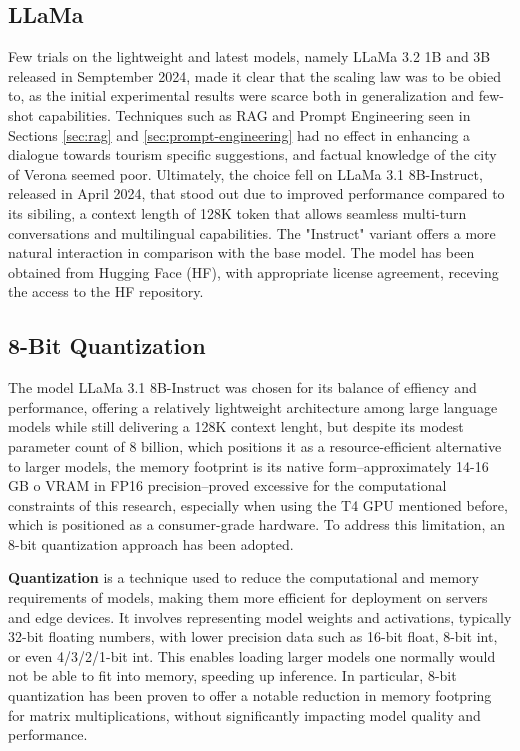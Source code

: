 \subsection{LLaMa}
\label{sec:llama}

Few trials on the lightweight and latest models, namely LLaMa 3.2 1B and 3B released in Semptember 2024, made it clear that the scaling law was to be obied to, as the initial experimental results were scarce both in generalization and few-shot capabilities. Techniques such as RAG and Prompt Engineering seen in Sections \ref{sec:rag} and \ref{sec:prompt-engineering} had no effect in enhancing a dialogue towards tourism specific suggestions, and factual knowledge of the city of Verona seemed poor. Ultimately, the choice fell on LLaMa 3.1 8B-Instruct, released in April 2024, that stood out due to improved performance compared to its sibiling, a context length of 128K token that allows seamless multi-turn conversations and multilingual capabilities. The "Instruct" variant offers a more natural interaction in comparison with the base model. The model has been obtained from Hugging Face (HF), with appropriate license agreement, receving the access to the HF repository.


\subsection{8-Bit Quantization}
\label{sec:quantization}

The model LLaMa 3.1 8B-Instruct was chosen for its balance of effiency and performance, offering a relatively lightweight architecture among large language models while still delivering a 128K context lenght, but despite its modest parameter count of 8 billion, which positions it as a resource-efficient alternative to larger models, the memory footprint is its native form--approximately 14-16 GB o VRAM in FP16 precision--proved excessive for the computational constraints of this research, especially when using the T4 GPU mentioned before, which is positioned as a consumer-grade hardware. To address this limitation, an 8-bit quantization approach has been adopted.

\textbf{Quantization} is a technique used to reduce the computational and memory requirements of models, making them more efficient for deployment on servers and edge devices. It involves representing model weights and activations, typically 32-bit floating numbers, with lower precision data such as 16-bit float, 8-bit int, or even 4/3/2/1-bit int. This enables loading larger models one normally would not be able to fit into memory, speeding up inference. \cite{dettmers2022int8} In particular, 8-bit quantization has been proven to offer a notable reduction in memory footpring for matrix multiplications, without significantly impacting model quality and performance.

